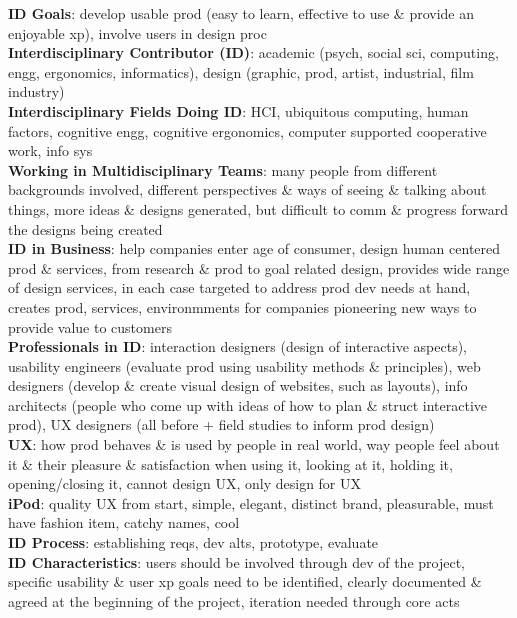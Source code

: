 \documentclass[a4paper]{article}
\begin{document}
\begin{multicols}{3}
        \textbf{ID Goals}: develop usable prod (easy to learn, effective to use \& provide an enjoyable xp), involve users in design proc\\
        \textbf{Interdisciplinary Contributor (ID)}: academic (psych, social sci, computing, engg, ergonomics, informatics), design (graphic, prod, artist, industrial, film industry)\\
        \textbf{Interdisciplinary Fields Doing ID}: HCI, ubiquitous computing, human factors, cognitive engg, cognitive ergonomics, computer supported cooperative work, info sys\\
        \textbf{Working in Multidisciplinary Teams}: many people from different backgrounds involved, different perspectives \& ways of seeing \& talking about things, more ideas \& designs generated, but difficult to comm \& progress forward the designs being created\\
        \textbf{ID in Business}: help companies enter age of consumer, design human centered prod \& services, from research \& prod to goal related design, provides wide range of design services, in each case targeted to address prod dev needs at hand, creates prod, services, environmments for companies pioneering new ways to provide value to customers\\
        \textbf{Professionals in ID}: interaction designers (design of interactive aspects), usability engineers (evaluate prod using usability methods \& principles), web designers (develop \& create visual design of websites, such as layouts), info architects (people who come up with ideas of how to plan \& struct interactive prod), UX designers (all before + field studies to inform prod design)\\
        \textbf{UX}: how prod behaves \& is used by people in real world, way people feel about it \& their pleasure \& satisfaction when using it, looking at it, holding it, opening/closing it, cannot design UX, only design for UX\\
        \textbf{iPod}: quality UX from start, simple, elegant, distinct brand, pleasurable, must have fashion item, catchy names, cool\\
        \textbf{ID Process}: establishing reqs, dev alts, prototype, evaluate\\
        \textbf{ID Characteristics}: users should be involved through dev of the project, specific usability \& user xp goals need to be identified, clearly documented \& agreed at the beginning of the project, iteration needed through core acts\\

\end{multicols}
\end{document}
